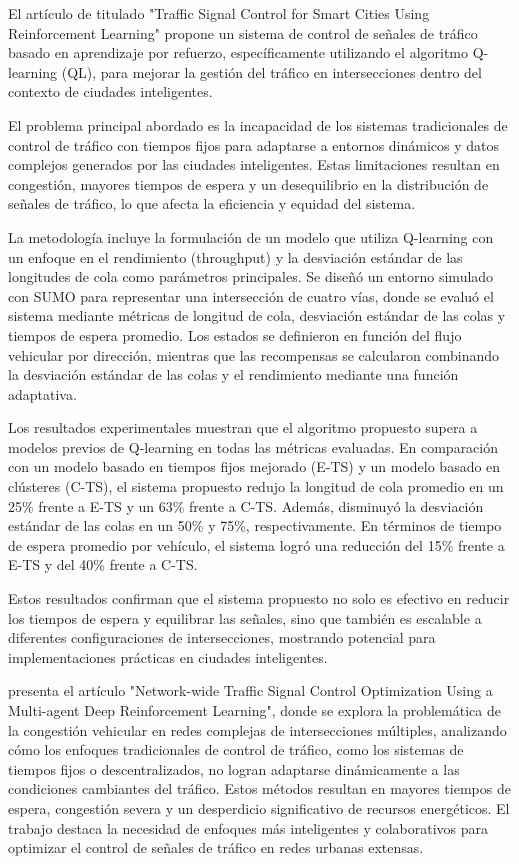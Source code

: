 El artículo de \cite{Joo2020} titulado "Traffic Signal Control for Smart Cities Using Reinforcement Learning" propone un sistema de control de señales de tráfico basado en aprendizaje por refuerzo, específicamente utilizando el algoritmo Q-learning (QL), para mejorar la gestión del tráfico en intersecciones dentro del contexto de ciudades inteligentes.

El problema principal abordado es la incapacidad de los sistemas tradicionales de control de tráfico con tiempos fijos para adaptarse a entornos dinámicos y datos complejos generados por las ciudades inteligentes. Estas limitaciones resultan en congestión, mayores tiempos de espera y un desequilibrio en la distribución de señales de tráfico, lo que afecta la eficiencia y equidad del sistema.

La metodología incluye la formulación de un modelo que utiliza Q-learning con un enfoque en el rendimiento (throughput) y la desviación estándar de las longitudes de cola como parámetros principales. Se diseñó un entorno simulado con SUMO para representar una intersección de cuatro vías, donde se evaluó el sistema mediante métricas de longitud de cola, desviación estándar de las colas y tiempos de espera promedio. Los estados se definieron en función del flujo vehicular por dirección, mientras que las recompensas se calcularon combinando la desviación estándar de las colas y el rendimiento mediante una función adaptativa.

Los resultados experimentales muestran que el algoritmo propuesto supera a modelos previos de Q-learning en todas las métricas evaluadas. En comparación con un modelo basado en tiempos fijos mejorado (E-TS) y un modelo basado en clústeres (C-TS), el sistema propuesto redujo la longitud de cola promedio en un 25\% frente a E-TS y un 63\% frente a C-TS. Además, disminuyó la desviación estándar de las colas en un 50\% y 75\%, respectivamente. En términos de tiempo de espera promedio por vehículo, el sistema logró una reducción del 15\% frente a E-TS y del 40\% frente a C-TS.

Estos resultados confirman que el sistema propuesto no solo es efectivo en reducir los tiempos de espera y equilibrar las señales, sino que también es escalable a diferentes configuraciones de intersecciones, mostrando potencial para implementaciones prácticas en ciudades inteligentes.

\cite{Li2021} presenta el artículo "Network-wide Traffic Signal Control Optimization Using a Multi-agent Deep Reinforcement Learning", donde se explora la problemática de la congestión vehicular en redes complejas de intersecciones múltiples, analizando cómo los enfoques tradicionales de control de tráfico, como los sistemas de tiempos fijos o descentralizados, no logran adaptarse dinámicamente a las condiciones cambiantes del tráfico. Estos métodos resultan en mayores tiempos de espera, congestión severa y un desperdicio significativo de recursos energéticos. El trabajo destaca la necesidad de enfoques más inteligentes y colaborativos para optimizar el control de señales de tráfico en redes urbanas extensas.

